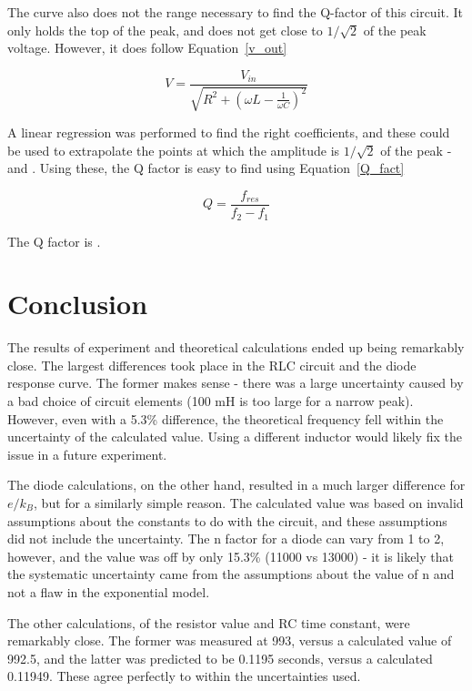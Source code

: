 \documentclass[journal]{IEEEtran}
\begin{document}
The curve also does not the range necessary to find the Q-factor of this
circuit. It only holds the top of the peak, and does not get close to
$1/\sqrt{2}$ of the peak voltage. However, it does follow Equation~\ref{v_out}

\begin{equation}
\label{v_out}
V = \frac{V_{in}}{\sqrt{R^2 + \left(\omega L - \frac{1}{\omega C} \right)^2}}
\end{equation}

A linear regression was performed to find the right coefficients, and these
could be used to extrapolate the points at which the amplitude is $1/\sqrt{2}$
of the peak -  and . Using these, the Q
factor is easy to find using Equation~\ref{Q_fact}

\begin{equation}
\label{Q_fact}
Q = \frac{f_{res}}{f_2 - f_1}
\end{equation}

The Q factor is .

\section{Conclusion}

The results of experiment and theoretical calculations ended up being
remarkably close. The largest differences took place in the RLC circuit and the
diode response curve. The former makes sense - there was a large uncertainty
caused by a bad choice of circuit elements (100 mH is too large for a narrow
peak). However, even with a 5.3\% difference, the theoretical frequency fell
within the uncertainty of the calculated value. Using a different inductor
would likely fix the issue in a future experiment.

The diode calculations, on the other hand, resulted in a much larger difference
for $e/k_B$, but for a similarly simple reason. The calculated value was based
    on invalid assumptions about the constants to do with the circuit, and
    these assumptions did not include the uncertainty. The n factor for a diode
    can vary from 1 to 2, however, and the value was off by only 15.3\% (11000
    vs 13000) - it is likely that the systematic uncertainty came from the
    assumptions about the value of n and not a flaw in the exponential model.

The other calculations, of the resistor value and RC time constant, were
remarkably close. The former was measured at 993, versus a calculated value of
992.5, and the latter was predicted to be 0.1195 seconds, versus a calculated
0.11949. These agree perfectly to within the uncertainties used.
\end{document}

